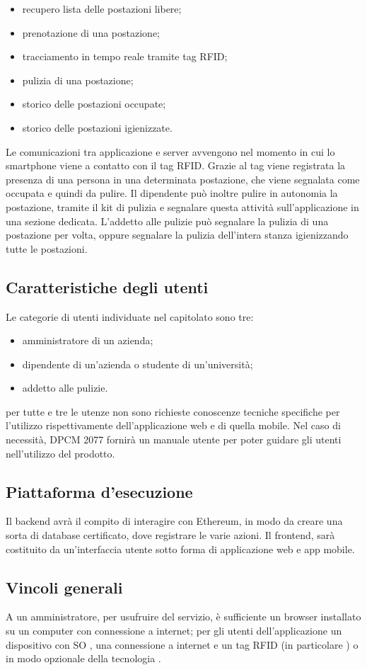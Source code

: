 \begin{itemize}
	\item recupero lista delle postazioni libere; \\
	\item prenotazione di una postazione; \\
	\item tracciamento in tempo reale tramite tag RFID; \\
	\item pulizia di una postazione; \\
	\item storico delle postazioni occupate; \\
	\item storico delle postazioni igienizzate. \\ 
\end{itemize}
Le comunicazioni tra applicazione e server avvengono nel momento in cui lo smartphone viene a contatto con il tag RFID. Grazie al tag viene registrata la presenza di una persona in una determinata postazione, che viene segnalata come occupata e quindi da pulire. Il dipendente può inoltre pulire in autonomia la postazione, tramite il kit di pulizia e segnalare questa attività sull’applicazione in una sezione dedicata.
L’addetto alle pulizie può segnalare la pulizia di una postazione per volta, oppure segnalare la pulizia dell’intera stanza igienizzando tutte le postazioni.

\subsection{Caratteristiche degli utenti}
Le categorie di utenti individuate nel capitolato sono tre:
\begin{itemize}
	\item amministratore di un azienda;
	\item dipendente di un'azienda o studente di un'università;
    \item addetto alle pulizie.
\end{itemize}
per tutte e tre le utenze non sono richieste conoscenze tecniche specifiche per l'utilizzo rispettivamente dell'applicazione web e di quella mobile. Nel caso di necessità, DPCM 2077 fornirà un manuale utente per poter guidare gli utenti nell'utilizzo del prodotto.
\subsection{Piattaforma d'esecuzione}
Il backend avrà il compito di interagire con Ethereum, in modo da creare una sorta di database certificato, dove registrare le varie azioni. Il frontend, sarà costituito da un'interfaccia utente sotto forma di applicazione web e app mobile. 
\subsection{Vincoli generali}
A un amministratore, per usufruire del servizio, è sufficiente un browser installato su un computer con connessione a internet; per gli utenti dell'applicazione un dispositivo con SO , una connessione a internet e un tag RFID (in particolare ) o in modo opzionale della tecnologia .

